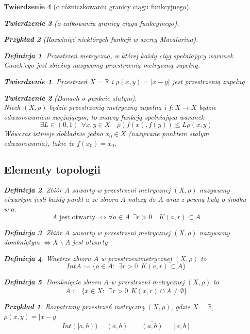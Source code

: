 \documentclass[12pt,a4paper]{article}
\newtheorem{tw}{Twierdzenie}
\newtheorem{przyklad}{Przykład}
\theoremstyle{definition}
\newtheorem{df}{Definicja}
\begin{document}
\begin{tw}[o różniczkowaniu granicy ciągu funkcyjnego]
\begin{tw}[o całkowaniu granicy ciągu funkcyjnego]
\begin{przyklad}[Rozwinięć niektórych funkcji w szereg Macalurina]
\begin{df}
Przestrzeń metryczna, w której każdy ciąg spełniający warunek Cauch'ego jest zbieżny nazywamy przestrzenią metryczną zupełną.
\end{df}

\begin{tw}
Przestrzeń $X = \mathbb{R}$ i $\rho (x,y) = |x-y|$ jest przestrzenią zupełną
\end{tw}

\begin{tw}[Banach o punkcie stałym]~\\
Niech $(X, \rho)$ będzie przestrzenią metryczną zupełną i $f: X \to X$ będzie odwzorowaniem zwężającym, to znaczy funkcją spełniająca warunek
$$ \exists L\in (0,1) ~~ \forall x,y\in X \quad \rho (f(x), f(y)) \leqslant L\rho (x, y) $$
Wówczas istnieje dokładnie jedno $x_0 \in X$ (nazywane punktem stałym odwzorowania), takie że $f(x_0) = x_0$. 
\end{tw}


\subsection{Elementy topologii}
\begin{df}
Zbiór $A$ zawarty w przestrzeni metrycznej $(X, \rho)$ nazywamy otwartym jesli każdy punkt $a$ ze zbioru $A$ nalezy do $A$ wraz z pewną kulą o środku w $a$.\\
$$A \text{ jest otwarty } \Leftrightarrow \forall a\in A ~~ \exists r>0 \quad K(a, r) \subset A$$
\end{df}
\begin{df}
Zbiór $A$ zawarty w przestrzeni metrycznej $(X, \rho)$ nazywamy domkniętym $ \Leftrightarrow X \smallsetminus A$ jest otwarty
\end{df}

\begin{df}
Wnętrze zbioru $A$ w przestrzenimetrycznej $(X, \rho)$ to 
$$ IntA := \{a\in A: ~~ \exists r>0 ~~ K(a,r) \subset A \} $$
\end{df}
\begin{df}
Domknięcie zbioru $A$ w przestrzeni metrycznej $(X, \rho)$ to 
$$ \overline{A} := \{x\in X: ~~ \exists r>0 ~~ K(x,r) \cap A \neq \emptyset \} $$
\end{df}

\begin{przyklad}
Rozpatrzmy przestrzeń metryczną $(X, \rho)$, gdzie $X = \mathbb{R}$, $\rho (x,y) = |x-y|$\\
$$Int([a,b)) = (a,b) \quad\quad \overline{(a,b)} = [a,b]$$
\end{przyklad}




\end{przyklad}
\end{tw}
\end{tw}
\end{document}
